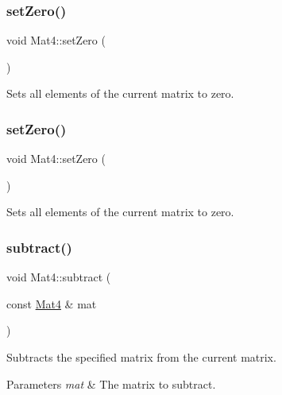 \subsubsection{\texorpdfstring{set\+Zero()}{setZero()}\hspace{0.1cm}{\footnotesize\ttfamily [1/2]}}
{\footnotesize\ttfamily void Mat4\+::set\+Zero (\begin{DoxyParamCaption}{ }\end{DoxyParamCaption})}

Sets all elements of the current matrix to zero. \mbox{\label{classMat4_a252b7afb2cfcd5e814fa2d3118d05de3}} 
\subsubsection{\texorpdfstring{set\+Zero()}{setZero()}\hspace{0.1cm}{\footnotesize\ttfamily [2/2]}}
{\footnotesize\ttfamily void Mat4\+::set\+Zero (\begin{DoxyParamCaption}{ }\end{DoxyParamCaption})}

Sets all elements of the current matrix to zero. \mbox{\label{classMat4_a3ad911389ec778e8f67aaced32be9193}} 
\subsubsection{\texorpdfstring{subtract()}{subtract()}\hspace{0.1cm}{\footnotesize\ttfamily [1/4]}}
{\footnotesize\ttfamily void Mat4\+::subtract (\begin{DoxyParamCaption}\item[{const \hyperlink{classMat4}{Mat4} \&}]{mat }\end{DoxyParamCaption})}

Subtracts the specified matrix from the current matrix.


\begin{DoxyParams}{Parameters}
{\em mat} & The matrix to subtract. \\
\hline
\end{DoxyParams}
\mbox{\label{classMat4_a3ad911389ec778e8f67aaced32be9193}} 
